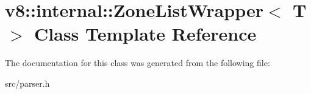\hypertarget{classv8_1_1internal_1_1_zone_list_wrapper}{}\section{v8\+:\+:internal\+:\+:Zone\+List\+Wrapper$<$ T $>$ Class Template Reference}
\label{classv8_1_1internal_1_1_zone_list_wrapper}


The documentation for this class was generated from the following file\+:\begin{DoxyCompactItemize}
\item 
src/parser.\+h\end{DoxyCompactItemize}
